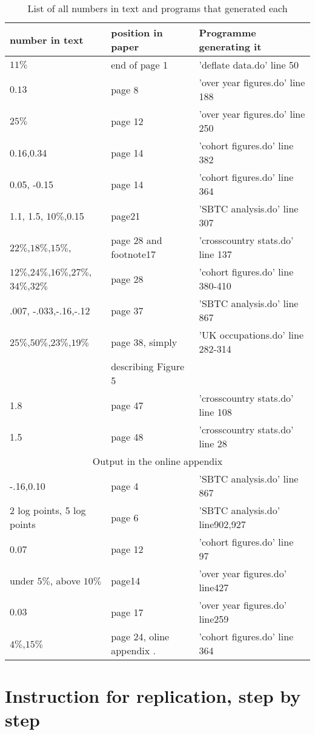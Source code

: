\documentclass[12pt]{article}
\begin{document}
\begin{table}[h]
\centering
\caption{List of all numbers in text and programs that generated each}
\label{tab:text}
\begin{tabular}{l l l}
\hline
number in text& position in paper & Programme generating it \\
\hline
$11\%$ & end of page 1 &'deflate data.do' line 50\\
\hline
$0.13$& page 8 &'over year figures.do' line 188\\
\hline
$25\%$ &page 12& 'over year figures.do'  line 250\\
\hline
0.16,0.34&page 14 &'cohort figures.do' line 382\\
\hline
0.05, -0.15&page 14 &'cohort figures.do' line 364\\
\hline
1.1, 1.5, $10\%$,0.15 &page21&'SBTC analysis.do' line 307\\
\hline
$22\%$,$18\%$,$15\%$, &page 28 and footnote17&'crosscountry stats.do' line 137\\
\hline
$12\%$,$24\%$,$16\%$,$27\%$,$34\%$,$32\%$&page 28&'cohort figures.do' line 380-410\\
\hline
.007, -.033,-.16,-.12 &page 37&'SBTC analysis.do' line 867\\
\hline
$25\%$,$50\%$,$23\%$,$19\%$&page 38, simply &'UK occupations.do' line 282-314\\
&describing Figure 5&\\
\hline
1.8 &page 47&'crosscountry stats.do' line 108\\
\hline
1.5 &page 48&'crosscountry stats.do' line 28\\
\hline
\hline
\multicolumn{3}{c}{Output in the online appendix}\\
\hline
-.16,0.10&page 4&'SBTC analysis.do' line 867 \\
\hline
2 log points, 5 log points& page 6&'SBTC analysis.do' line902,927\\
\hline
0.07 &page 12&'cohort figures.do' line 97\\
\hline
under $5\%$, above $10\%$ & page14&'over year figures.do' line427\\
\hline
$0.03$ & page 17&'over year figures.do' line259\\
\hline
$4\%$,$15\%$& page 24, oline appendix .&'cohort figures.do' line 364\\
\hline
\end{tabular}
\end{table}

\section{Instruction for replication, step by step}
\label{steps}
\end{document}
